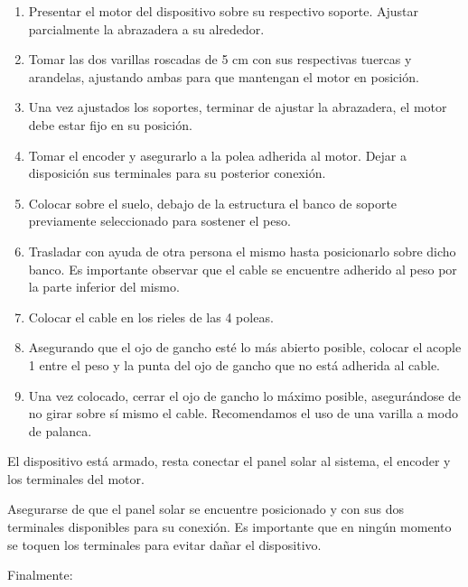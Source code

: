         \begin{enumerate}
            \item Presentar el motor del dispositivo sobre su respectivo soporte. Ajustar parcialmente la abrazadera a su alrededor.
            \item Tomar las dos varillas roscadas de 5 cm con sus respectivas tuercas y arandelas, ajustando ambas para que mantengan el motor en posición.
            \item Una vez ajustados los soportes, terminar de ajustar la abrazadera, el motor debe estar fijo en su posición.
            \item Tomar el encoder y asegurarlo a la polea adherida al motor. Dejar a disposición sus terminales para su posterior conexión.
            \item Colocar sobre el suelo, debajo de la estructura el banco de soporte previamente seleccionado para sostener el peso.
            \item Trasladar con ayuda de otra persona el mismo hasta posicionarlo sobre dicho banco. Es importante observar que el cable se encuentre adherido al peso por la parte inferior del mismo.
            \item Colocar el cable en los rieles de las 4 poleas.
            \item Asegurando que el ojo de gancho esté lo más abierto posible, colocar el acople 1 entre el peso y la punta del ojo de gancho que no está adherida al cable.
            \item Una vez colocado, cerrar el ojo de gancho lo máximo posible, asegurándose de no girar sobre sí mismo el cable. Recomendamos el uso de una varilla a modo de palanca.
        \end{enumerate}
        
        El dispositivo está armado, resta conectar el panel solar al sistema, el encoder y los terminales del motor.\par
        Asegurarse de que el panel solar se encuentre posicionado y con sus dos terminales disponibles para su conexión. Es importante que en ningún momento se toquen los terminales para evitar dañar el dispositivo.\par
        
        Finalmente:\par

